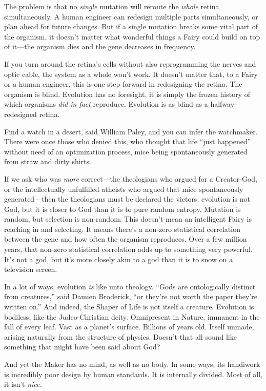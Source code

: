 {
 The problem is that no \textit{single} mutation will reroute the
\textit{whole} retina simultaneously. A human engineer can redesign
multiple parts simultaneously, or plan ahead for future changes. But if
a single mutation breaks some vital part of the organism, it
doesn't matter what wonderful things a Fairy could
build on top of it---the organism dies and the gene decreases in
frequency.}

{
 If you turn around the retina's cells without also
reprogramming the nerves and optic cable, the system as a whole
won't work. It doesn't matter that, to
a Fairy or a human engineer, this is one step forward in redesigning
the retina. The organism is blind. Evolution has no foresight, it is
simply the frozen history of which organisms \textit{did in fact}
reproduce. Evolution is as blind as a halfway-redesigned retina.}

{
 Find a watch in a desert, said William Paley, and you can infer
the watchmaker. There were once those who denied this, who thought that
life ``just happened'' without need
of an optimization process, mice being spontaneously generated from
straw and dirty shirts.}

{
 If we ask who was \textit{more} correct---the theologians who
argued for a Creator-God, or the intellectually unfulfilled atheists
who argued that mice spontaneously generated---then the theologians
must be declared the victors: evolution is not God, but it is closer to
God than it is to pure random entropy. Mutation is random, but
selection is non-random. This doesn't mean an
intelligent Fairy is reaching in and selecting. It means
there's a non-zero statistical correlation between the
gene and how often the organism reproduces. Over a few million years,
that non-zero statistical correlation adds up to something very
powerful. It's not a god, but it's more
closely akin to a god than it is to snow on a television screen.}

{
 In a lot of ways, evolution \textit{is} like unto theology.
``Gods are ontologically distinct from
creatures,'' said Damien Broderick,
``or they're not worth the paper
they're written on.'' And indeed, the
Shaper of Life is not itself a creature. Evolution is bodiless, like
the Judeo-Christian deity. Omnipresent in Nature, immanent in the fall
of every leaf. Vast as a planet's surface. Billions of
years old. Itself unmade, arising naturally from the structure of
physics. Doesn't that all sound like something that
might have been said about God?}

{
 And yet the Maker has no mind, as well as no body. In some ways,
its handiwork is incredibly poor design by human standards. It is
internally divided. Most of all, it isn't
\textit{nice.}}

